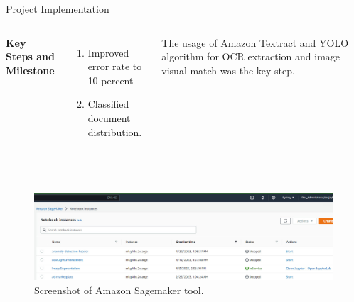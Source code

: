 \documentclass[aspectratio=169,xcolor=dvipsnames]{beamer}
\begin{document}

\begin{frame}{Project Implementation}
    \tableofcontents
    \begin{columns}[c] %

        \textbf{Key Steps and Milestone}
        \begin{enumerate}
            \item Improved error rate to 10 percent
            \item Classified document distribution.
        
        \end{enumerate}

         The usage of Amazon Textract and YOLO algorithm for OCR extraction and image visual match was the key step.

    \end{columns}   \\

  \begin{figure}
   \includegraphics[width=420]{tool.jpg}
      \caption{Screenshot of Amazon Sagemaker tool.}
\end{figure}

\end{frame}
\end{document}
